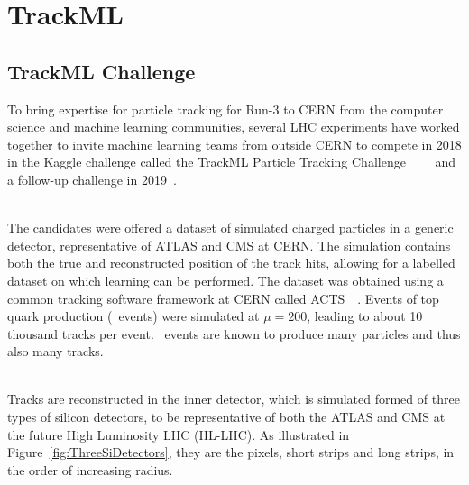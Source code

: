 \chapter{TrackML}
\label{chapter:TrackML}

\section{TrackML Challenge}

To bring expertise for particle tracking for Run-3 to CERN from the computer science and machine learning communities, several LHC experiments have worked together to invite machine learning teams from outside CERN to compete in 2018 in the Kaggle challenge called the TrackML Particle Tracking Challenge~\cite{TrackML}~\cite{TrackMLPPTBefore}~\cite{TrackMLPPTAfter}~\cite{TrackMLPPTAfter2} and a follow-up challenge in 2019~\cite{TrackML2}.

\ \\The candidates were offered a dataset of simulated charged particles in a generic detector, representative of ATLAS and CMS at CERN. The simulation contains both the true and reconstructed position of the track hits, allowing for a labelled dataset on which learning can be performed. The dataset was obtained using a common tracking software framework at CERN called ACTS~\cite{ACTS}~\cite{ACTSPPT}. Events of top quark production (\ttbar~events) were simulated at $\mu=200$, leading to about 10 thousand tracks per event. \ttbar~events are known to produce many particles and thus also many tracks. 

\ \\Tracks are reconstructed in the inner detector, which is simulated formed of three types of silicon detectors, to be representative of both the ATLAS and CMS at the future High Luminosity LHC (HL-LHC). As illustrated in Figure~\ref{fig:ThreeSiDetectors}, they are the pixels, short strips and long strips, in the order of increasing radius. 

